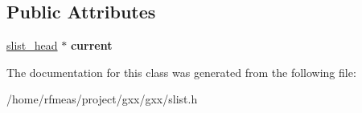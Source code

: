 \subsection*{Public Attributes}
\begin{DoxyCompactItemize}
\item 
\hyperlink{structslist__head}{slist\+\_\+head} $\ast$ {\bfseries current}\hypertarget{classgxx_1_1slist_1_1iterator_a4351b0352861fe009f8246d640b38358}{}\label{classgxx_1_1slist_1_1iterator_a4351b0352861fe009f8246d640b38358}

\end{DoxyCompactItemize}


The documentation for this class was generated from the following file\+:\begin{DoxyCompactItemize}
\item 
/home/rfmeas/project/gxx/gxx/slist.\+h\end{DoxyCompactItemize}
